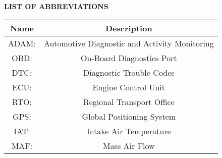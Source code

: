 \newpage

\begin{center}
\textbf{\LARGE LIST OF ABBREVIATIONS}\\[1cm]
\end{center}
\begin{table}[h]
    \large
    \centering
    \begin{tabular}{|c|c|} %
        \hline
        \textbf{Name} & \textbf{Description} \\[1cm] 
        \hline
        ADAM: & Automotive Diagnostic and Activity Monitoring  \\[1cm]
        \hline
        OBD: & On-Board Diagnostics Port \\[1cm]
        \hline
        DTC: & Diagnostic Trouble Codes \\[1cm]
        \hline
        ECU: & Engine Control Unit \\[1cm]
        \hline
        RTO: & Regional Transport Office \\[1cm]
        \hline
        GPS: & Global Positioning System \\[1cm]
        \hline
        IAT: & Intake Air Temperature \\[1cm]
        \hline
        MAF: & Mass Air Flow \\[1cm]
        \hline
    \end{tabular}
\end{table}